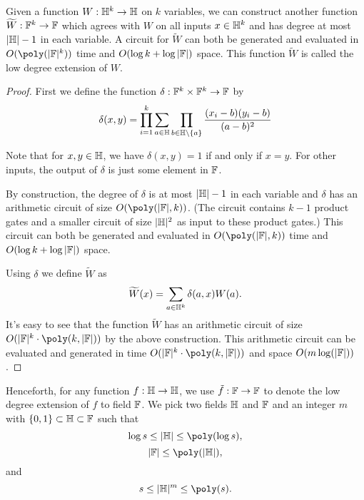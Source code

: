 \begin{lemma}\label{lem:lde}
  Given a function $W:\mathbb{H}^k \to \mathbb{H}$ on $k$ variables, we can construct another
  function $\widetilde{W}:\mathbb{F}^k \to \mathbb{F}$ which agrees with $W$ on all inputs $x
  \in \mathbb{H}^k$ and has degree at most $|\mathbb{H}|-1$ in each variable. A circuit for
  $\tilde{W}$ can both be generated and evaluated in $O(\poly(|\F|^k))$ time
  and $O(\log k + \log |\mathbb{F}|)$ space. This function $\tilde{W}$ is called the
  low degree extension of $W$.
\end{lemma}

\begin{proof}
  First we define the function $\delta : \mathbb{F}^k \times \mathbb{F}^k \to \mathbb{F}$ by
  \begin{equation}
    \delta(x,y) = \prod_{i=1}^k \sum_{a \in \mathbb{H}} \prod_{b \in \mathbb{H}\setminus\{a\}} \frac{(x_i-b)(y_i-b)}{(a-b)^2}
  \end{equation}

  Note that for $x, y \in \mathbb{H}$, we have $\delta(x, y) = 1$ if and only if $x =
  y$. For other inputs, the output of $\delta$ is just some element in $\mathbb{F}$.

  By construction, the degree of $\delta$ is at most $|\mathbb{H}|-1$ in each variable
  and $\delta$ has an arithmetic circuit of size $O(\poly(|\F|, k))$. (The
  circuit contains $k-1$ product gates and a smaller circuit of size $|\mathbb{H}|^2$
  as input to these product gates.) This circuit can both be generated and
  evaluated in $O(\poly(|\F|, k))$ time and $O(\log k + \log |\mathbb{F}|)$ space.

  Using $\delta$ we define $\widetilde{W}$ as
	\begin{equation*}
    \widetilde{W}(x) = \sum_{a \in \mathbb{H}^k} \delta(a,x) W(a).
	\end{equation*}
  It's easy to see that the function $\widetilde{W}$ has an arithmetic circuit
  of size $O(|\F|^k \cdot \poly(k , |\F|))$ by the above construction. This
  arithmetic circuit can be evaluated and generated in time $O(|\F|^k \cdot
  \poly(k , |\F|))$ and space $O(m \log (|\mathbb{F}|))$.
\end{proof}

Henceforth, for any function $f: \mathbb{H} \to \mathbb{H}$, we use $\tilde{f}:\mathbb{F} \to \mathbb{F}$ to
denote the low degree extension of $f$ to field $\mathbb{F}$. We pick two fields $\mathbb{H}$
and $\mathbb{F}$ and an integer $m$ with $\{0,1\} \subset \mathbb{H} \subset \mathbb{F}$ such that
\begin{equation}
  \log s \leq |\fH| \leq \poly(\log s),
\end{equation}
\begin{equation}
  |\F| \leq \poly(|\fH|),
\end{equation}
and
\begin{equation}
  s \leq |\fH|^m \leq \poly(s).
\end{equation}

